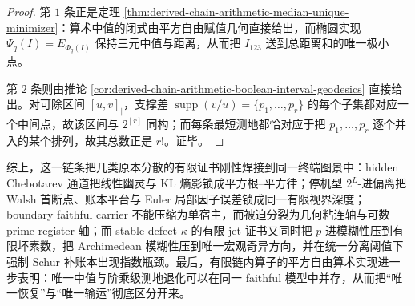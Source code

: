 \begin{proof}
第 \(1\) 条正是定理 \ref{thm:derived-chain-arithmetic-median-unique-minimizer}：算术中值的闭式由平方自由赋值几何直接给出，而椭圆实现 \(\Psi_q(I)=E_{\Phi_q(I)}\) 保持三元中值与距离，从而把 \(I_{123}\) 送到总距离和的唯一极小点。

第 \(2\) 条则由推论 \ref{cor:derived-chain-arithmetic-boolean-interval-geodesics} 直接给出。对可除区间 \([u,v]_{\mid}\)，支撑差 \(\operatorname{supp}(v/u)=\{p_1,\dots,p_r\}\) 的每个子集都对应一个中间点，故该区间与 \(2^{[r]}\) 同构；而每条最短测地都恰对应于把 \(p_1,\dots,p_r\) 逐个并入的某个排列，故其总数正是 \(r!\)。证毕。
\end{proof}

综上，这一链条把几类原本分散的有限证书刚性焊接到同一终端图景中：hidden Chebotarev 通道把线性幽灵与 KL 熵影锁成平方根--平方律；停机型 \(2^L\)-进偏离把 Walsh 首断点、账本平台与 Euler 局部因子误差锁成同一有限视界深度；boundary faithful carrier 不能压缩为单宿主，而被迫分裂为几何粘连轴与可数 prime-register 轴；而 stable defect-\(\kappa\) 的有限 jet 证书又同时把 \(p\)-进模糊性压到有限坏素数，把 Archimedean 模糊性压到唯一宏观奇异方向，并在统一分离阈值下强制 Schur 补账本出现指数瓶颈。最后，有限链内算子的平方自由算术实现进一步表明：唯一中值与阶乘级测地退化可以在同一 faithful 模型中并存，从而把“唯一恢复”与“唯一输运”彻底区分开来。
